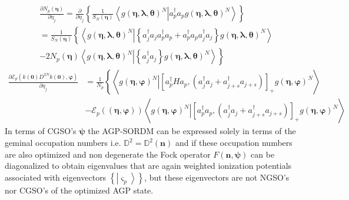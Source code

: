 \documentclass[aps,preprint]{revtex4}%
\begin{document}
\begin{align}
&  \frac{\partial N_{p}\left(  \mathbf{\eta}\right)  }{\partial\eta_{j}}%
=\frac{\partial}{\partial\eta_{j}}\left\{  \frac{1}{S_{N}\left(  \mathbf{\eta
}\right)  }\left\langle \left.  g\left(  \mathbf{\eta},\mathbf{\lambda
},\mathbf{\theta}\right)  ^{N}\right\vert a_{p}^{\dagger}a_{p}g\left(
\mathbf{\eta},\mathbf{\lambda},\mathbf{\theta}\right)  ^{N}\right\rangle
\right\} \\
&  =\frac{1}{S_{N}\left(  \mathbf{\eta}\right)  }\left\{  \left\langle \left.
g\left(  \mathbf{\eta},\mathbf{\lambda},\mathbf{\theta}\right)  ^{N}%
\right\vert \left\{  a_{j}^{\dagger}a_{j}a_{p}^{\dagger}a_{p}+a_{p}^{\dagger
}a_{p}a_{j}^{\dagger}a_{j}\right\}  g\left(  \mathbf{\eta},\mathbf{\lambda
},\mathbf{\theta}\right)  ^{N}\right\rangle \right. \\
&  \left.  -2N_{p}\left(  \mathbf{\eta}\right)  \left\langle \left.  g\left(
\mathbf{\eta},\mathbf{\lambda},\mathbf{\theta}\right)  ^{N}\right\vert
\left\{  a_{j}^{\dagger}a_{j}\right\}  g\left(  \mathbf{\eta},\mathbf{\lambda
},\mathbf{\theta}\right)  ^{N}\right\rangle \right\}
\end{align}%
\begin{align}
\frac{\partial\mathcal{E}_{p}\left(  k\left(  \mathbf{0}\right)
D^{2N}k\left(  \mathbf{0}\right)  ,\mathbf{\varphi}\right)  }{\partial\eta
_{j}}  &  =\frac{1}{N_{p}}\left\{  \left\langle \left.  g\left(  \mathbf{\eta
},\mathbf{\varphi}\right)  ^{N}\right\vert \left[  a_{p}^{\dagger}%
Ha_{p},\left(  a_{j}^{\dagger}a_{j}+a_{j+s}^{\dagger}a_{j+s}\right)  \right]
_{+}g\left(  \mathbf{\eta},\mathbf{\varphi}\right)  ^{N}\right\rangle \right.
\\
&  -\mathcal{E}_{p}\left(  \left(  \mathbf{\eta},\mathbf{\varphi}\right)
\right)  \left\langle \left.  g\left(  \mathbf{\eta},\mathbf{\varphi}\right)
^{N}\right\vert \left[  a_{p}^{\dagger}a_{p},\left(  a_{j}^{\dagger}%
a_{j}+a_{j+s}^{\dagger}a_{j+s}\right)  \right]  _{+}g\left(  \mathbf{\eta
},\mathbf{\varphi}\right)  ^{N}\right\rangle
\end{align}
In terms of CGSO's $\mathbf{\psi}$ the AGP-SORDM can be expressed solely in
terms of the geminal occupation numbers i.e. $\mathbb{D}^{2}=\mathbb{D}%
^{2}\left(  \mathbf{n}\right)  $ and if these occupation numbers are also
optimized and non degenerate the Fock operator $F\left(  \mathbf{n}%
,\mathbf{\psi}\right)  $ can be diagonalized to obtain eigenvalues that are
again weighted ionization potentials associated with eigenvectors $\left\{
\left\vert \varsigma_{p}\right\rangle \right\}  $, but these eigenvectors are
not NGSO's nor CGSO's of the optimized AGP state.
\end{document}
